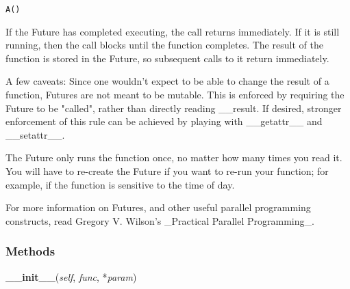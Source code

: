 \begin{alltt}
\pysrcprompt{{\textgreater}{\textgreater}{\textgreater} } A()\end{alltt}
If the Future has completed executing, the call returns immediately. If it 
is still running, then the call blocks until the function completes. The 
result of the function is stored in the Future, so subsequent calls to it 
return immediately.

A few caveats: Since one wouldn't expect to be able to change the result of
a function, Futures are not meant to be mutable. This is enforced by 
requiring the Future to be "called", rather than directly reading 
\_\_result. If desired, stronger enforcement of this rule can be achieved 
by playing with \_\_getattr\_\_ and \_\_setattr\_\_.

The Future only runs the function once, no matter how many times you read 
it. You will have to re-create the Future if you want to re-run your 
function; for example, if the function is sensitive to the time of day.

For more information on Futures, and other useful parallel programming 
constructs, read Gregory V. Wilson's \_Practical Parallel Programming\_.



  \subsubsection{Methods}

    \label{Epigrass:epigrass:Future:__init__}

    \vspace{0.5ex}

    \begin{boxedminipage}{\textwidth}

    \raggedright \textbf{\_\_init\_\_}(\textit{self}, \textit{func}, *\textit{param})

    \end{boxedminipage}

    \label{Epigrass:epigrass:Future:__repr__}

